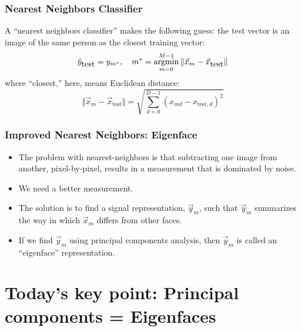 \documentclass{beamer}
\newcommand{\argmin}{\operatornamewithlimits{argmin}}
\begin{document}
\begin{frame}
  \frametitle{Nearest Neighbors Classifier}

  A ``nearest neighbors classifier'' makes the following
  guess: the test vector is an image of the same person as the
  closest training vector:
  \[
  \hat{y}_{\mbox{test}} = y_{m^*},~~~
  m^*=\argmin_{m=0}^{M-1}\Vert\vec{x}_m-\vec{x}_{\mbox{test}}\Vert
  \]
  where ``closest,'' here, means Euclidean distance:
  \[
  \Vert\vec{x}_m-\vec{x}_{\mbox{test}}\Vert =
  \sqrt{\sum_{d=0}^{D-1} (x_{md}-x_{\mbox{test},d})^2}
  \]
\end{frame}

\begin{frame}
  \frametitle{Improved Nearest Neighbors: Eigenface}

  \begin{itemize}
    \item 
      The problem with nearest-neighbors is that subtracting one image
      from another, pixel-by-pixel, results in a measurement that is
      dominated by noise.
    \item 
      We need a better measurement.
    \item
      The solution is to find a signal representation, $\vec{y}_m$,
      such that $\vec{y}_m$ summarizes the way in which $\vec{x}_m$
      differs from other faces.
    \item
      If we find $\vec{y}_m$ using principal components analysis, then
      $\vec{y}_m$ is called an ``eigenface'' representation.
  \end{itemize}
\end{frame}
  

\section[PCA]{Today's key point: Principal components = Eigenfaces}
\setcounter{subsection}{1}
\end{document}
